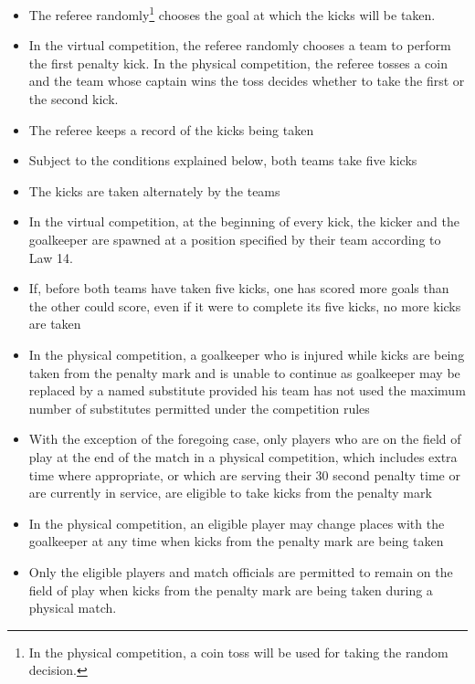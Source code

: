 \begin{itemize}
\item The referee randomly\footnote{In the physical competition, a coin toss will be used for taking the random decision.} chooses the goal at which the kicks will be taken.
\item In the virtual competition, the referee randomly chooses a team to perform the first penalty kick. In the physical competition, the referee tosses a coin and the team whose captain wins the toss decides whether to take the first or the second kick.
\item The referee keeps a record of the kicks being taken 
\item Subject to the conditions explained below, both teams take five kicks 
\item The kicks are taken alternately by the teams 
\item In the virtual competition, at the beginning of every kick, the kicker and the goalkeeper are spawned at
    a position specified by their team according to Law 14.
\item If, before both teams have taken five kicks, one has scored more goals than the other could score, even if it were to complete its five kicks, no more kicks are taken
\item In the physical competition, a goalkeeper who is injured while kicks are being taken from the penalty mark and is unable to continue as goalkeeper may be replaced by a named substitute provided his team has not used the maximum number of substitutes permitted under the competition rules
\item With the exception of the foregoing case,
      only players who are on the field of play at the end of the match in a physical competition,
      which includes extra time where appropriate,
      or which are serving their 30 second penalty time or are currently in service,
      are eligible to take kicks from the penalty mark

\item In the physical competition, an eligible player may change places with the goalkeeper at any time when kicks from the penalty mark are being taken
\item Only the eligible players and match officials are permitted to
    remain on the field of play when kicks from the penalty mark are being
    taken during a physical match.


\end{itemize}
